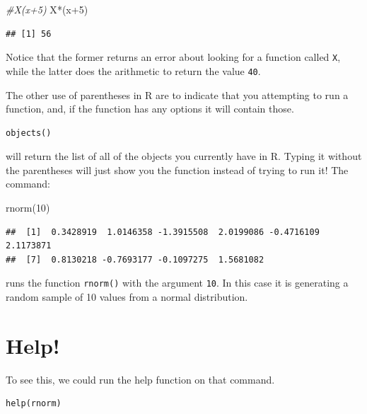 \documentclass[
]{book}
\newenvironment{Shaded}{\begin{snugshade}}{\end{snugshade}}
\newcommand{\CommentTok}[1]{\textcolor[rgb]{0.56,0.35,0.01}{\textit{#1}}}
\newcommand{\DecValTok}[1]{\textcolor[rgb]{0.00,0.00,0.81}{#1}}
\newcommand{\FunctionTok}[1]{\textcolor[rgb]{0.00,0.00,0.00}{#1}}
\newcommand{\NormalTok}[1]{#1}
\newcommand{\SpecialCharTok}[1]{\textcolor[rgb]{0.00,0.00,0.00}{#1}}
\begin{document}
\begin{Shaded}
\begin{Highlighting}[]
\CommentTok{\#X(x+5)}
\NormalTok{X}\SpecialCharTok{*}\NormalTok{(x}\SpecialCharTok{+}\DecValTok{5}\NormalTok{)}
\end{Highlighting}
\end{Shaded}

\begin{verbatim}
## [1] 56
\end{verbatim}

Notice that the former returns an error about looking for a function called \texttt{X}, while the latter does the arithmetic to return the value \texttt{40}.

The other use of parentheses in R are to indicate that you attempting to run a function, and, if the function has any options it will contain those.

\begin{verbatim}
objects()
\end{verbatim}

will return the list of all of the objects you currently have in R. Typing it without the parentheses will just show you the function instead of trying to run it! The command:

\begin{Shaded}
\begin{Highlighting}[]
\FunctionTok{rnorm}\NormalTok{(}\DecValTok{10}\NormalTok{)}
\end{Highlighting}
\end{Shaded}

\begin{verbatim}
##  [1]  0.3428919  1.0146358 -1.3915508  2.0199086 -0.4716109  2.1173871
##  [7]  0.8130218 -0.7693177 -0.1097275  1.5681082
\end{verbatim}

runs the function \texttt{rnorm()} with the argument \texttt{10}. In this case it is generating a random sample of 10 values from a normal distribution.

\hypertarget{help}{%
\section{Help!}\label{help}}

To see this, we could run the help function on that command.

\begin{verbatim}
help(rnorm)
\end{verbatim}
\end{document}
